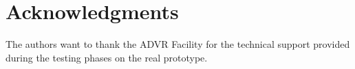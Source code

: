 \section*{Acknowledgments}
The authors want to thank the ADVR Facility for the technical support provided during the testing phases on the real prototype. 